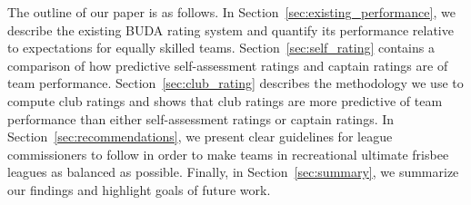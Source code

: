 The outline of our paper is as follows. In Section~\ref{sec:existing_performance}, we describe the existing BUDA rating system and quantify its performance relative to expectations for equally skilled teams. Section~\ref{sec:self_rating} contains a comparison of how predictive self-assessment ratings and captain ratings are of team performance.  Section~\ref{sec:club_rating} describes the methodology we use to compute club ratings and shows that club ratings are more predictive of team performance than either self-assessment ratings or captain ratings. In Section~\ref{sec:recommendations}, we present clear guidelines for league commissioners to follow in order to make teams in recreational ultimate frisbee leagues as balanced as possible. Finally, in Section~\ref{sec:summary}, we summarize our findings and highlight goals of future work.